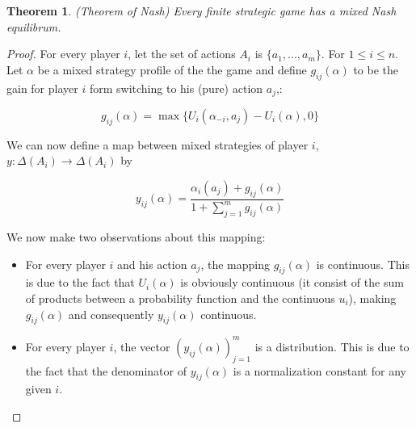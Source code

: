 \documentclass[a4paper,11pt]{article}
\newtheorem{theorem}{Theorem}[section]
\begin{document}
\begin{theorem}(Theorem of Nash)
Every finite strategic game has a mixed Nash equilibrum.
\end{theorem}

\begin{proof}
For every player $i$, let the set of actions $A_i$ is $\{a_{1}, ..., a_{m}\}$. For $1\leq i\leq n$. Let $\alpha$ be a mixed strategy profile of the the game and define $g_{ij}(\alpha)$ to be the gain for player $i$ form switching to his (pure) action $a_{j}$,:

$$g_{ij}(\alpha) = \max\{U_i(\alpha_{-i}, a_{j}) - U_i(\alpha),0\}$$

We can now define a map between mixed strategies of player $i$, $y:\Delta(A_i)\rightarrow \Delta(A_i)$ by

$$y_{ij}(\alpha) = \frac{\alpha_{i}(a_j)+g_{ij}(\alpha)}{1+\sum_{j=1}^{m}{g_{ij}(\alpha)}}$$

We now make two observations about this mapping:

\begin{itemize}
  \item For every player $i$ and his action $a_{j}$, the mapping $g_{ij}(\alpha)$ is continuous. This is due to the fact that $U_i(\alpha)$ is obviously continuous (it consist of the sum of products between a probability function and the continuous $u_i$), making $g_{ij}(\alpha)$ and consequently $y_{ij}(\alpha)$ continuous.

  \item For every player $i$, the vector $(y_{ij}(\alpha))_{j=1}^{m}$ is a distribution. This is due to the fact that the denominator of $y_{ij}(\alpha)$ is a normalization constant for any given $i$.



\end{itemize}
\end{proof}
\end{document}
